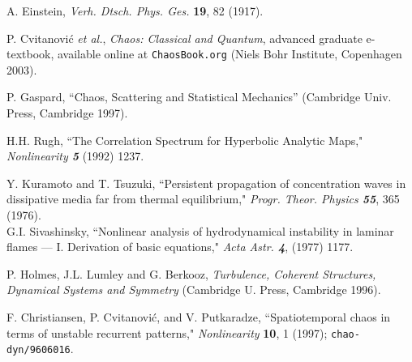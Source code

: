 
\begin{thebibliography}{999}

 A. Einstein, {\em Verh. Dtsch. Phys. Ges.}
        {\bf 19}, 82 (1917).

 P. Cvitanovi\'c {\em et al.},
{\em  Chaos: Classical and Quantum},
advanced graduate e-textbook, available
online at {\tt ChaosBook.org}
    (Niels Bohr Institute, Copenhagen 2003).

 P. Gaspard,
        ``Chaos, Scattering and Statistical Mechanics''
        (Cambridge Univ. Press, Cambridge 1997).

 H.H. Rugh,
        ``The Correlation Spectrum for Hyperbolic Analytic Maps,"
    {\em Nonlinearity \bf 5} (1992) 1237.

    Y. Kuramoto and T. Tsuzuki,
    ``Persistent propagation of concentration waves in
          dissipative media far from thermal equilibrium,"
    {\em Progr. Theor. Physics \bf 55}, 365 (1976).
    \\
    G.I. Sivashinsky,
   ``Nonlinear analysis of hydrodynamical instability
            in laminar flames --- I. Derivation of basic equations,"
    {\em Acta Astr. \bf 4}, (1977) 1177.

 P. Holmes, J.L. Lumley and G. Berkooz,
        {\em Turbulence, Coherent Structures,
        Dynamical Systems and Symmetry}
        (Cambridge U. Press, Cambridge 1996).

 F. Christiansen, P. Cvitanovi\'c, and V. Putkaradze,
    ``Spatiotemporal chaos in terms of unstable recurrent patterns,"
    {\em Nonlinearity} {\bf 10}, 1 (1997);
    {\tt chao-dyn/9606016}.


\end{thebibliography}


